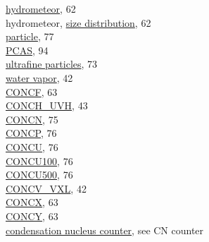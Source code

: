 \documentclass[
]{book}
\begin{document}
\hspace*{0.333em}\hspace*{0.333em}\href{./5-cloud-physics-variables.html\#concentration}{hydrometeor}, 62\\
\hspace*{0.333em}\hspace*{0.333em}hydrometeor, \href{./5-cloud-physics-variables.html\#size-distribution}{size distribution}, 62\\
\hspace*{0.333em}\hspace*{0.333em}\href{./5-cloud-physics-variables.html\#size-distribution}{particle}, 77\\
\hspace*{0.333em}\hspace*{0.333em}\href{./7-aerosol-particle-measurements.html\#concu-concp}{PCAS}, 94\\
\hspace*{0.333em}\hspace*{0.333em}\href{./7-aerosol-particle-measurements.html\#condensation-nucleus-counter}{ultrafine particles}, 73\\
\hspace*{0.333em}\hspace*{0.333em}\href{./4-the-state-of-the-atmosphere.html\#vxcel-corr}{water vapor}, 42\\
\href{./5-cloud-physics-variables.html\#concentration}{CONCF}, 63\\
\href{./4-the-state-of-the-atmosphere.html\#uvh-n}{CONCH\_UVH}, 43\\
\href{./7-aerosol-particle-measurements.html\#concn}{CONCN}, 75\\
\href{./7-aerosol-particle-measurements.html\#concu-concp}{CONCP}, 76\\
\href{./7-aerosol-particle-measurements.html\#concu-concp}{CONCU}, 76\\
\href{./5-cloud-physics-variables.html\#concentration}{CONCU100}, 76\\
\href{./5-cloud-physics-variables.html\#concentration}{CONCU500}, 76\\
\href{./4-the-state-of-the-atmosphere.html\#vcsel-corr}{CONCV\_VXL}, 42\\
\href{./5-cloud-physics-variables.html\#concentration}{CONCX}, 63\\
\href{./5-cloud-physics-variables.html\#concentration}{CONCY}, 63\\
\href{./7-aerosol-particle-measurements.html\#condensation-nucleus-counter}{condensation nucleus counter}, see CN counter\\
\end{document}
